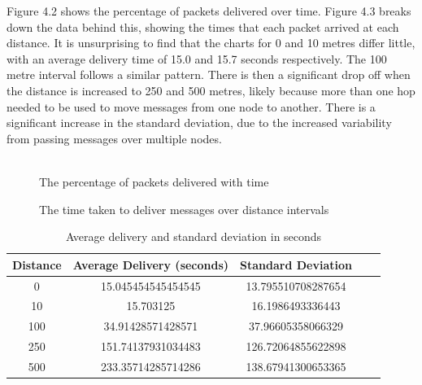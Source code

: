 \documentclass[12pt,a4paper]{report}
\begin{document}
Figure 4.2 shows the percentage of packets delivered over time. Figure 4.3 breaks down the data behind this, showing the times that each packet arrived at each distance. It is unsurprising to find that the charts for 0 and 10 metres differ little, with an average delivery time of 15.0 and 15.7 seconds respectively. The 100 metre interval follows a similar pattern. There is then a significant drop off when the distance is increased to 250 and 500 metres, likely because more than one hop needed to be used to move messages from one node to another. There is a significant increase in the standard deviation, due to the increased variability from passing messages over multiple nodes. \\ \\
\begin{figure}
\begin{center}

\end{center}
\caption{The percentage of packets delivered with time}
\end{figure}
\begin{figure}
\begin{center}

\end{center}
\caption{The time taken to deliver messages over distance intervals}
\end{figure}

\begin{table}
\begin{center}
\begin{tabular}{ |c|c|c|c|c| } 
\hline
Distance & Average Delivery (seconds) & Standard Deviation \\ 
\hline
0 & 15.045454545454545 & 13.795510708287654 \\ 
\hline
10 & 15.703125 & 16.1986493336443 \\ 
\hline
100 & 34.91428571428571 & 37.96605358066329 \\ 
\hline
250 & 151.74137931034483 & 126.72064855622898 \\ 
\hline
500 & 233.35714285714286 & 138.67941300653365 \\ 
\hline
\end{tabular}
\end{center}
\caption{Average delivery and standard deviation in seconds}
\end{table} 

\FloatBarrier
\end{document}
